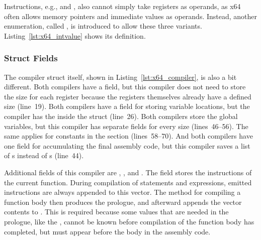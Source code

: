 Instructions, e.g.,  and , also cannot simply take registers as operands, as x64 often allows memory pointers and immediate values as operands.
Instead, another enumeration, called , is introduced to allow these three variants.
Listing~\ref{lst:x64_intvalue} shows its definition.

\subsubsection{Struct Fields}


The compiler struct itself, shown in Listing~\ref{lst:x64_compiler}, is also a bit different.
Both compilers have a  field, but this compiler does not need to store the size for each register because the registers themselves already have a defined size (line~19).
Both compilers have a  field for storing variable locations, but the \riscv{} compiler has the  inside the  struct (line~26).
Both compilers store the global variables, but this compiler has separate fields for every size (lines~46--56).
The same applies for constants in the  section (lines~58--70).
And both compilers have one field for accumulating the final assembly code, but this compiler saves a list of s instead of s (line~44).


Additional fields of this compiler are , , and .
The  field stores the instructions of the current function.
During compilation of statements and expressions, emitted instructions are always appended to this vector.
The method for compiling a function body then produces the prologue, and afterward appends the vector contents to .
This is required because some values that are needed in the prologue, like the , cannot be known before compilation of the function body has completed, but must appear before the body in the assembly code.

